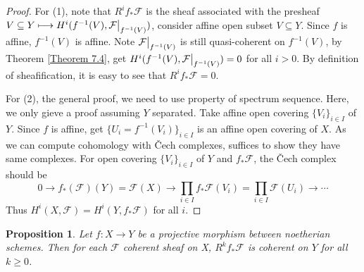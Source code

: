 \documentclass{ctexart}
\newtheorem{proposition}{Proposition}[section]
\begin{document}
\begin{proof}
    For (1), note that $R^{i}f_{\ast}\mathcal{F}$ is the sheaf associated with the presheaf $V \subseteq Y \longmapsto H^{i}(f^{-1}(V), \mathcal{F}\big{|}_{f^{-1}(V)})$,
    consider affine open subset $V \subseteq Y$.
    Since $f$ is affine, $f^{-1}(V)$ is affine.
    Note $\mathcal{F}\big{|}_{f^{-1}(V)}$ is still quasi-coherent on $f^{-1}(V)$,
    by Theorem \ref{Theorem 7.4}, get $H^{i}(f^{-1}(V), \mathcal{F}\big{|}_{f^{-1}(V)}) = 0$ for all $i > 0$.
    By definition of sheafification, it is easy to see that $R^{i}f_{\ast}\mathcal{F} = 0$.
    \par
    For (2), the general proof, we need to use property of spectrum sequence.
    Here, we only gieve a proof assuming $Y$ separated.
    Take affine open covering $\{V_{i}\}_{i\in I}$ of $Y$.
    Since $f$ is affine, get $\{U_{i} = f^{-1}(V_{i})\}_{i\in I}$ is an affine open covering of $X$.
    As we can compute cohomology with Čech complexes, suffices to show they have same complexes.
    For open covering $\{V_{i}\}_{i\in I}$ of $Y$ and $f_{\ast}\mathcal{F}$, the Čech complex should be
    \begin{equation*}
        0 \longrightarrow f_{\ast}(\mathcal{F})(Y) = \mathcal{F}(X) \longrightarrow \prod_{i\in I} f_{\ast}\mathcal{F}(V_{i}) = \prod_{i\in I} \mathcal{F}(U_{i}) \longrightarrow \cdots   
    \end{equation*}
    Thus $H^{i}(X, \mathcal{F}) = H^{i}(Y, f_{\ast}\mathcal{F})$ for all $i$.
\end{proof}
\begin{proposition}
    Let $f: X\longrightarrow Y$ be a projective morphism between noetherian schemes.
    Then for each $\mathcal{F}$ coherent sheaf on X, $R^{k}f_{\ast}\mathcal{F}$ is coherent on $Y$ for all $k \ge 0$.
    \label{Proposition 7.10}
\end{proposition}
\end{document}
